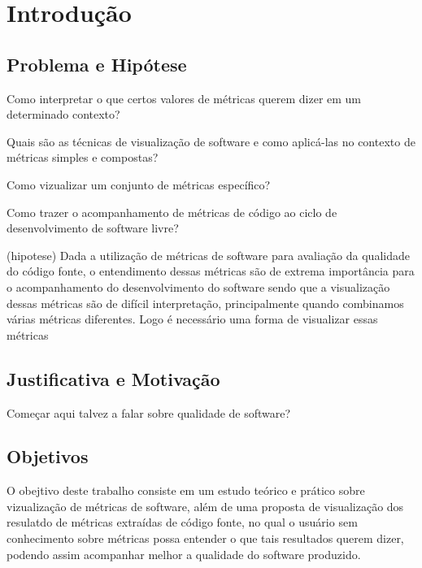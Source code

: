 \chapter{Introdução}
\label{cap-introducao}

\section{Problema e Hipótese}

%

Como interpretar o que certos valores de métricas querem dizer em um
determinado contexto?

Quais são as técnicas de visualização de software e como aplicá-las no contexto
de métricas simples e compostas?

Como vizualizar um conjunto de métricas específico?

Como trazer  o acompanhamento de métricas de código ao ciclo de desenvolvimento
de software livre?

(hipotese)
Dada a utilização de métricas de software para avaliação da qualidade do código
fonte, o entendimento dessas métricas são de extrema importância para o
acompanhamento do desenvolvimento do software sendo que a visualização dessas
métricas são de difícil interpretação, principalmente quando combinamos várias
métricas diferentes. Logo é necessário uma forma de visualizar essas métricas


\section{Justificativa e Motivação}

%

Começar aqui talvez a falar sobre qualidade de software?

\section{Objetivos}

%

O obejtivo deste trabalho consiste em um estudo teórico e prático sobre
vizualização de métricas de software, além de uma proposta de visualização dos
resulatdo de métricas extraídas de código fonte, no qual o usuário sem
conhecimento sobre métricas possa entender o que tais resultados querem dizer,
podendo assim acompanhar melhor a qualidade do software produzido.
%

